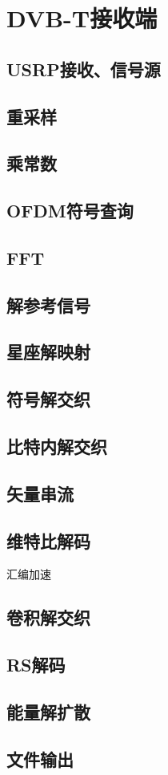 \chapter{DVB-T接收端}
\section{USRP接收、信号源}
\section{重采样}
\section{乘常数}
\section{OFDM符号查询}
\section{FFT}
\section{解参考信号}
\section{星座解映射}
\section{符号解交织}
\section{比特内解交织}
\section{矢量串流}
\section{维特比解码}
汇编加速
\section{卷积解交织}
\section{RS解码}
\section{能量解扩散}
\section{文件输出}
